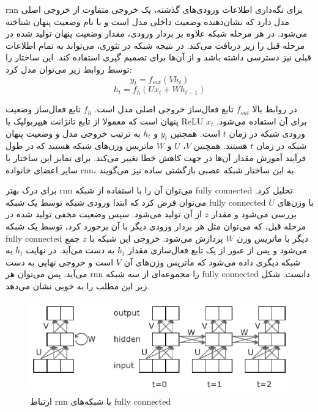 \gls{rnn} برای نگه‌داری اطلاعات ورودی‌های گذشته، یک خروجی متفاوت از خروجی اصلی
مدل دارد که نشان‌دهنده وضعیت داخلی مدل است و با نام وضعیت پنهان شناخته می‌شود.
در هر مرحله شبکه علاوه بر بردار ورودی، مقدار وضعیت پنهان تولید شده در مرحله قبل
را زیر دریافت می‌کند. در نتیجه شبکه در تئوری، می‌تواند به تمام اطلاعات قبلی نیز
دسترسی داشته باشد و از آن‌ها برای تصمیم گیری استفاده کند. این ساختار را توسط
روابط زیر می‌توان مدل کرد:
\begin{equation}
    y_t = f_{out}(Vh_t)
\end{equation}
\begin{equation}
    h_t = f_h(Ux_t + Wh_{t-1})
\end{equation}

در روابط بالا $f_{out}$ تابع فعال‌ساز خروجی اصلی مدل است. $f_h$ تابع فعال‌ساز
وضعیت پنهان است که معمولا از تابع تانژانت هیپربولیک یا ReLU برای آن استفاده
می‌شود. $x_t$ ورودی شبکه در زمان $t$ است. همچنین $y_t$ و $h_t$ به ترتیب خروجی
مدل و وضعیت پنهان شبکه در زمان $t$ هستند. همچنین $V$، $U$ و $W$ ماتریس وزن‌های
شبکه هستند که در طول فرآیند آموزش مقدار آن‌ها در جهت کاهش خطا تغییر می‌کند. برای
تمایز این ساختار با سایر اعضای خانواده \gls{rnn}، به این ساختار شبکه عصبی
بازگشتی ساده نیز می‌گویند.

برای درک بهتر \gls{rnn} می‌توان آن را با استفاده از شبکه \gls{fully connected}
تحلیل کرد. می‌توان فرض کرد که ابتدا ورودی شبکه توسط یک شبکه \gls{fully
connected} با وزن‌های $U$ بررسی می‌شود و مقدار $z$ از آن تولید می‌شود. سپس وضعیت
مخفی تولید شده در مرحله قبل، که می‌توان مثل هر بردار ورودی دیگر با آن برخورد
کرد، توسط یک شبکه \gls{fully connected} دیگر با ماتریس وزن $W$ پردازش می‌شود.
خروجی این شبکه با $z$ جمع می‌شود و پس از عبور از یک تابع فعال‌سازی مقدار $h_t$
به دست می‌آید. در نهایت $h_t$ به شبکه دیگری داده می‌شود که ماتریس وزن‌های آن $V$
است و خروجی نهایی به دست می‌آید. پس می‌توان هر \gls{rnn} را مجموعه‌ای از سه شبکه
\gls{fully connected} دانست. شکل زیر این مطلب را به خوبی نشان می‌دهد.
\begin{figure}[ht]
    \centering
    \includegraphics[height=4cm]{./statics/rnn_unfolding.png}
    \caption{ارتباط \gls{rnn} با شبکه‌های \gls{fully connected}}
\end{figure}

